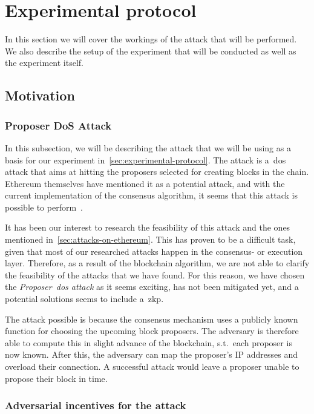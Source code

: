 

\section{Experimental protocol}\label{sec:experimental-protocol}
In this section we will cover the workings of the attack that will be performed.
We also describe the setup of the experiment that will be conducted as well as the experiment itself.

\subsection{Motivation}\label{subsec:proposer-dos-attack}
\subsubsection{Proposer DoS Attack}
In this subsection, we will be describing the attack that we will be using as a basis for our experiment in~\autoref{sec:experimental-protocol}.
The attack is a~\gls{dos} attack that aims at hitting the proposers selected for creating blocks in the chain.
Ethereum themselves have mentioned it as a potential attack, and with the current implementation of the consensus algorithm, it seems that this attack is possible to perform~\cite{EthereumSSLE2024,EthereumAttackDefense2024}.

It has been our interest to research the feasibility of this attack and the ones mentioned in~\autoref{sec:attacks-on-ethereum}.
This has proven to be a difficult task, given that most of our researched attacks happen in the consensus- or execution layer.
Therefore, as a result of the blockchain algorithm, we are not able to clarify the feasibility of the attacks that we have found.
For this reason, we have chosen the \textit{Proposer~\gls{dos} attack} as it seems exciting, has not been mitigated yet, and a potential solutions seems to include a~\gls{zkp}.

The attack possible is because the consensus mechanism uses a publicly known function for choosing the upcoming block proposers.
The adversary is therefore able to compute this in slight advance of the blockchain, s.t.\ each proposer is now known.
After this, the adversary can map the proposer's IP addresses and overload their connection.
A successful attack would leave a proposer unable to propose their block in time.

\subsubsection{Adversarial incentives for the attack}

